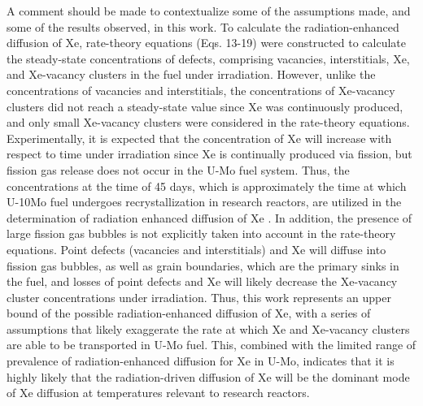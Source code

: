 \documentclass[preprint,12pt]{elsarticle}
\begin{document}
\indent  A comment should be made to contextualize some of the assumptions made, and some of the results observed, in this work. To calculate the radiation-enhanced diffusion of Xe, rate-theory equations (Eqs. 13-19) were constructed to calculate the steady-state concentrations of defects, comprising vacancies, interstitials, Xe, and Xe-vacancy clusters in the fuel under irradiation. However, unlike the concentrations of vacancies and interstitials, the concentrations of Xe-vacancy clusters did not reach a steady-state value since Xe was continuously produced, and only small Xe-vacancy clusters were considered in the rate-theory equations. Experimentally, it is expected that the concentration of Xe will increase with respect to time under irradiation since Xe is continually produced via fission, but fission gas release does not occur in the U-Mo fuel system. Thus, the concentrations at the time of 45 days, which is approximately the time at which U-10Mo fuel undergoes recrystallization in research reactors, are utilized in the determination of radiation enhanced diffusion of Xe \cite{kim2013recrystallization, leenaers2016high, perez2012rertr1,perez2012rertr2, smith2022high}. In addition, the presence of large fission gas bubbles is not explicitly taken into account in the rate-theory equations. Point defects (vacancies and interstitials) and Xe will diffuse into fission gas bubbles, as well as grain boundaries, which are the primary sinks in the fuel, and losses of point defects and Xe will likely decrease the Xe-vacancy cluster concentrations under irradiation. Thus, this work represents an upper bound of the possible radiation-enhanced diffusion of Xe, with a series of assumptions that likely exaggerate the rate at which Xe and Xe-vacancy clusters are able to be transported in U-Mo fuel. This, combined with the limited range of prevalence of radiation-enhanced diffusion for Xe in U-Mo, indicates that it is highly likely that the radiation-driven diffusion of Xe will be the dominant mode of Xe diffusion at temperatures relevant to research reactors.\\
\end{document}
